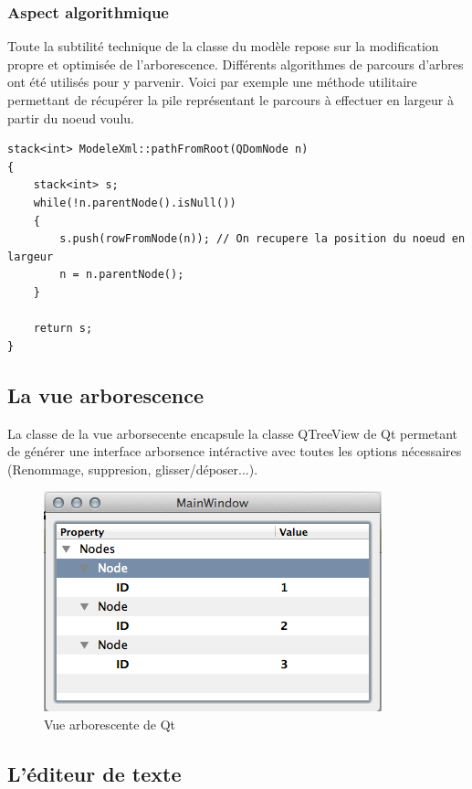 \subsubsection{Aspect algorithmique}
Toute la subtilité technique de la classe du modèle repose sur la modification propre et optimisée de l'arborescence.
Différents algorithmes de parcours d'arbres ont été utilisés pour y parvenir. Voici par exemple une méthode utilitaire permettant de récupérer la pile représentant le parcours à effectuer en largeur à partir du noeud voulu.

\begin{lstlisting}
stack<int> ModeleXml::pathFromRoot(QDomNode n)
{
    stack<int> s;
    while(!n.parentNode().isNull())
    {
        s.push(rowFromNode(n)); // On recupere la position du noeud en largeur
        n = n.parentNode();
    }

    return s;
}
\end{lstlisting}

\subsection{La vue arborescence}

La classe de la vue arborsecente encapsule la classe QTreeView de Qt permetant de générer une interface arborsence
intéractive avec toutes les options nécessaires (Renommage, suppresion, glisser/déposer...).

\begin{figure}[h!]
\begin{minipage}[b]{\linewidth}
\centering \includegraphics[scale=0.5]{images/arbo.png}
\caption{Vue arborescente de Qt}
\label{arbo}
\end{minipage}
\end{figure}


\subsection{L'éditeur de texte}


